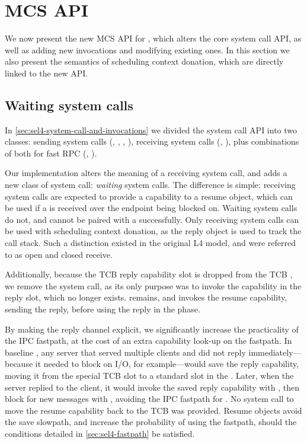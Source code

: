 \section{MCS API}
\label{s:new-api}

We now present the new \gls{MCS} API for \selfour, which alters the core system call API, 
as well as adding new invocations and modifying existing ones. In this section we also
present the semantics of scheduling context donation, which are directly linked to the new API.

\subsection{Waiting system calls}

In \cref{sec:sel4-system-call-and-invocations} we divided the \selfour system call API into two
classes: sending system calls (\send, \nbsend, \call, \reply),
receiving system calls (\recv, \nbrecv), plus combinations of both for fast 
RPC (\call, \replyrecv).  

Our implementation alters the meaning of a receiving system call, and adds a new class of system
call: \emph{waiting} system calls. The difference is simple: receiving system calls are expected to
provide a capability to a resume object, which can be used if a \call is received over
the endpoint being blocked on. Waiting system calls do not, and cannot be paired with a \call
successfully. Only receiving system calls can be used with scheduling context donation, as the reply
object is used to track the call stack. Such a distinction existed in the original L4 model, 
and were referred to as open and closed receive.

Additionally, because the TCB reply capability slot is dropped from the \gls{TCB} \cnode, we remove the \reply 
system call, as its only purpose was to invoke the capability in the reply slot, which no longer exists.
\replyrecv remains, and invokes the resume capability, sending the reply, before using the
reply in the \recv phase. 

By making the reply channel explicit, we significantly increase the practicality of the IPC
fastpath, at the cost of an extra capability look-up on the fastpath. In baseline \selfour, any server that served multiple clients and did not reply
immediately---because it needed to block on I/O, for example---would save the reply
capability, moving it from the special TCB slot to a standard slot in the \cspace. Later, when
the server replied to the client, it would invoke the saved reply capability with \send, then block
for new messages with \recv, avoiding the IPC fastpath for \replyrecv. No system call to move the 
resume capability back to the \gls{TCB} \cnode was provided.
Resume objects avoid the save slowpath, and increase the probability of using the fastpath, should the conditions detailed in \cref{sec:sel4-fastpath} be satisfied.

